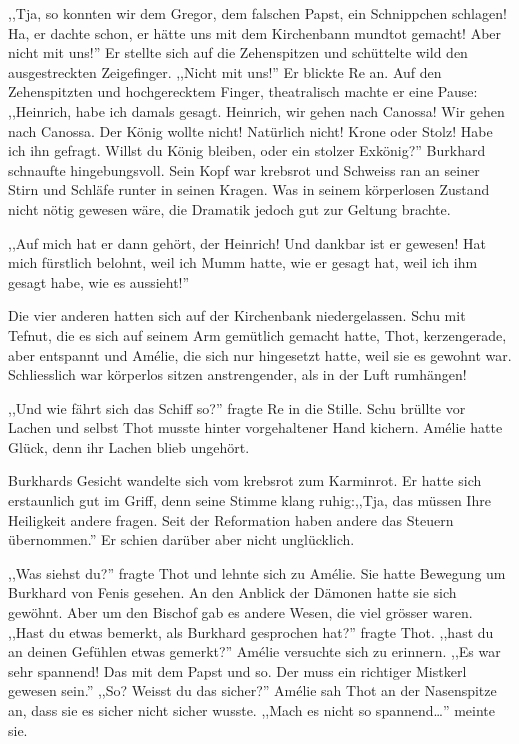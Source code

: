 \documentclass[11pt,titlepage,a5paper]{book}
\begin{document}
,,Tja, so konnten wir dem Gregor, dem falschen Papst, ein Schnippchen schlagen! Ha, er dachte schon, er hätte uns mit dem Kirchenbann mundtot gemacht! Aber nicht mit uns!'' Er stellte sich auf die Zehenspitzen und schüttelte wild den ausgestreckten Zeigefinger. ,,Nicht mit uns!'' Er blickte Re an. Auf den Zehenspitzten und hochgerecktem Finger, theatralisch machte er eine Pause: ,,Heinrich, habe ich damals gesagt. Heinrich, wir gehen nach Canossa! Wir gehen nach Canossa. Der König wollte nicht! Natürlich nicht! Krone oder Stolz! Habe ich ihn gefragt. Willst du König bleiben, oder ein stolzer Exkönig?'' Burkhard schnaufte hingebungsvoll. Sein Kopf war krebsrot und Schweiss ran an seiner Stirn und Schläfe runter in seinen Kragen. Was in seinem körperlosen Zustand nicht nötig gewesen wäre, die Dramatik jedoch gut zur Geltung brachte.

,,Auf mich hat er dann gehört, der Heinrich! Und dankbar ist er gewesen! Hat mich fürstlich belohnt, weil ich Mumm hatte, wie er gesagt hat, weil ich ihm gesagt habe, wie es aussieht!''

Die vier anderen hatten sich auf der Kirchenbank niedergelassen. Schu mit Tefnut, die es sich auf seinem Arm gemütlich gemacht hatte, Thot, kerzengerade, aber entspannt und Amélie, die sich nur hingesetzt hatte, weil sie es gewohnt war. Schliesslich war körperlos sitzen anstrengender, als in der Luft rumhängen!

,,Und wie fährt sich das Schiff so?'' fragte Re in die Stille. Schu brüllte vor Lachen und selbst Thot musste hinter vorgehaltener Hand kichern. Amélie hatte Glück, denn ihr Lachen blieb ungehört.

Burkhards Gesicht wandelte sich vom krebsrot zum Karminrot. Er hatte sich erstaunlich gut im Griff, denn seine Stimme klang ruhig:,,Tja, das müssen Ihre Heiligkeit andere fragen. Seit der Reformation haben andere das Steuern übernommen.'' Er schien darüber aber nicht unglücklich.

,,Was siehst du?'' fragte Thot und lehnte sich zu Amélie. Sie hatte Bewegung um Burkhard von Fenis gesehen. An den Anblick der Dämonen hatte sie sich gewöhnt. Aber um den Bischof gab es andere Wesen, die viel grösser waren. ,,Hast du etwas bemerkt, als Burkhard gesprochen hat?'' fragte Thot. ,,hast du an deinen Gefühlen etwas gemerkt?'' Amélie versuchte sich zu erinnern. ,,Es war sehr spannend! Das mit dem Papst und so. Der muss ein richtiger Mistkerl gewesen sein.'' ,,So? Weisst du das sicher?'' Amélie sah Thot an der Nasenspitze an, dass sie es sicher nicht sicher wusste. ,,Mach es nicht so spannend\dots'' meinte sie.
\end{document}
